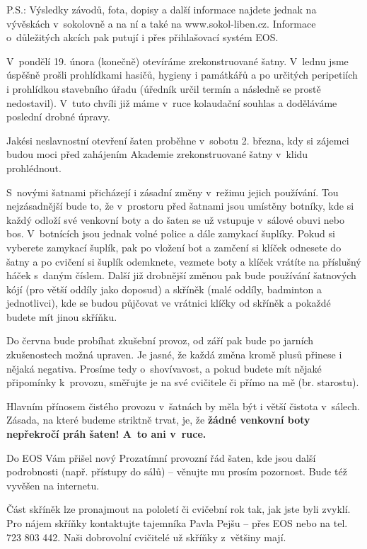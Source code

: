 \documentclass[11pt]{article}
\begin{document}
\noindent
P.S.: Výsledky závodů, fota, dopisy a další informace najdete jednak na vývěskách v~sokolovně a na ní a také na www.sokol-liben.cz. Informace o~důležitých akcích pak putují i přes přihlašovací systém EOS.


\vspace*{24pt}

V~pondělí 19. února (konečně) otevíráme zrekonstruované šatny. V~lednu jsme úspěšně prošli prohlídkami hasičů, hygieny i památkářů a po určitých peripetiích i prohlídkou stavebního úřadu (úředník určil termín a následně se prostě nedostavil). V~tuto chvíli již máme v~ruce kolaudační souhlas a doděláváme poslední drobné úpravy. 

Jakési neslavnostní \luv{}otevření\ruv{} šaten proběhne v~sobotu 2. března, kdy si zájemci budou moci před zahájením Akademie zrekonstruované šatny v~klidu prohlédnout.

S~novými šatnami přicházejí i zásadní změny v~režimu jejich používání. Tou nejzásadnější bude to, že v~prostoru před šatnami jsou umístěny botníky, kde si každý odloží své venkovní boty a do šaten se už vstupuje v~sálové obuvi nebo bos. V~botnících jsou jednak volné police a dále zamykací šuplíky. Pokud si vyberete zamykací šuplík, pak po vložení bot a zamčení si klíček odnesete do šatny a po cvičení si šuplík odemknete, vezmete boty a klíček vrátíte na příslušný háček s~daným číslem. Další již drobnější změnou pak bude používání šatnových kójí (pro větší oddíly jako doposud) a skříněk (malé oddíly, badminton a jednotlivci), kde se budou půjčovat ve vrátnici klíčky od skříněk a pokaždé budete mít jinou skříňku.

Do června bude probíhat zkušební provoz, od září pak bude po jarních zkušenostech možná upraven. Je jasné, že každá změna kromě plusů přinese i nějaká negativa. Prosíme tedy o~shovívavost, a pokud budete mít nějaké připomínky k~provozu, směřujte je na své cvičitele či přímo na mě (br. starostu).

Hlavním přínosem čistého provozu v~šatnách by měla být i větší čistota v~sálech. Zásada, na které budeme striktně trvat, je, že \textbf{žádné venkovní boty nepřekročí práh šaten! A~to ani v~ruce.}

Do EOS Vám přišel nový Prozatímní provozní řád šaten, kde jsou další podrobnosti (např. přístupy do sálů) – věnujte mu prosím pozornost. Bude též vyvěšen na internetu. 

Část skříněk lze pronajmout na pololetí či cvičební rok tak, jak jste byli zvyklí. Pro nájem skříňky kontaktujte tajemníka Pavla Pejšu – přes EOS nebo na tel. 723 803 442. Naši dobrovolní cvičitelé už skříňky z~většiny mají. 
\end{document}
